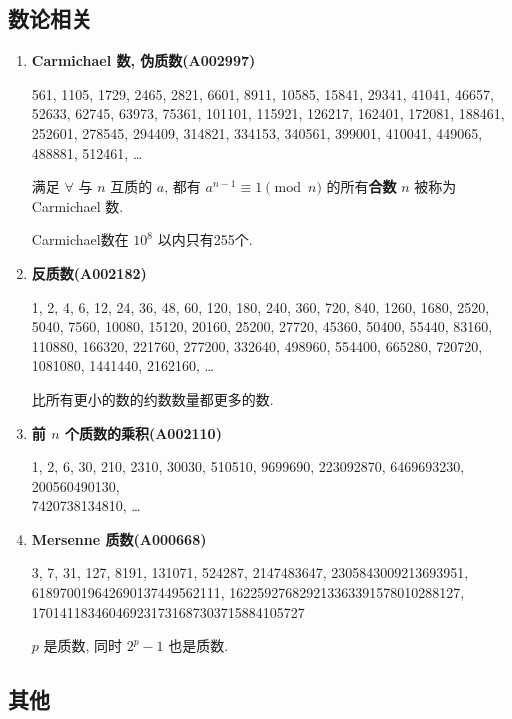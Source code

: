 \subsection{数论相关}

\begin{enumerate}

\item \textbf{Carmichael 数, 伪质数(A002997)}

561, 1105, 1729, 2465, 2821, 6601, 8911, 10585, 15841, 29341, 41041, 46657, 52633, 62745, 63973, 75361, 101101, 115921, 126217, 162401, 172081, 188461, 252601, 278545, 294409, 314821, 334153, 340561, 399001, 410041, 449065, 488881, 512461, \dots

满足 \(\forall\) 与 \(n\) 互质的 \(a\), 都有 \(a ^ {n - 1} \equiv 1 \pmod n\) 的所有\textbf{合数} \(n\) 被称为 Carmichael 数.

Carmichael数在 \(10^8\) 以内只有255个.

\item \textbf{反质数(A002182)}

1, 2, 4, 6, 12, 24, 36, 48, 60, 120, 180, 240, 360, 720, 840, 1260, 1680, 2520, 5040, 7560, 10080, 15120, 20160, 25200, 27720, 45360, 50400, 55440, 83160, 110880, 166320, 221760, 277200, 332640, 498960, 554400, 665280, 720720, 1081080, 1441440, 2162160, \dots

比所有更小的数的约数数量都更多的数.

\item \textbf{前 \(n\) 个质数的乘积(A002110)}

1, 2, 6, 30, 210, 2310, 30030, 510510, 9699690, 223092870, 6469693230, 200560490130,\\7420738134810, \dots

\item \textbf{Mersenne 质数(A000668)}

3, 7, 31, 127, 8191, 131071, 524287, 2147483647, 2305843009213693951,\\618970019642690137449562111, 162259276829213363391578010288127,\\170141183460469231731687303715884105727

\(p\) 是质数, 同时 \(2^p - 1\) 也是质数.

\end{enumerate}

\subsection{其他}

